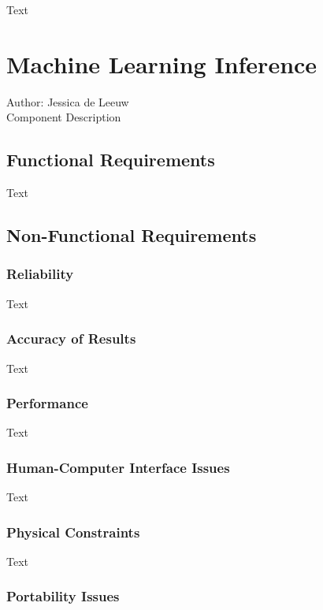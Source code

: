 \documentclass[12pt]{article}
\begin{document}
Text

\section{Machine Learning Inference}
Author: Jessica de Leeuw\\

\noindent Component Description

\subsection{Functional Requirements}

Text

\subsection{Non-Functional Requirements}

\subsubsection {Reliability}

Text

\subsubsection {Accuracy of Results}

Text

\subsubsection {Performance}

Text

\subsubsection {Human-Computer Interface Issues}

Text

\subsubsection {Physical Constraints}

Text

\subsubsection {Portability Issues}
\end{document}
